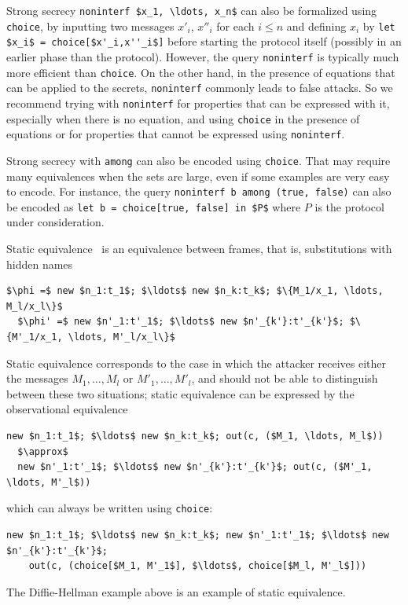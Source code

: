 \documentclass{book}
\begin{document}
Strong secrecy \lstinline!noninterf $x_1, \ldots, x_n$! can also be
formalized using \lstinline!choice!, by inputting two messages $x'_i$,
$x''_i$ for each $i \leq n$ and defining $x_i$ by
\lstinline!let $x_i$ = choice[$x'_i,x''_i$]!
before starting the protocol itself (possibly
in an earlier phase than the protocol). However, the query
\lstinline!noninterf! is typically much more efficient than
\lstinline!choice!. On the other hand, in the presence of equations
that can be applied to the secrets, \lstinline!noninterf! commonly
leads to false attacks. So we recommend trying with
\lstinline!noninterf! for properties that can be expressed with it,
especially when there is no equation, and using \lstinline!choice!  in
the presence of equations or for properties that cannot be expressed
using \lstinline!noninterf!.

Strong secrecy with \lstinline!among! can also be encoded using
\lstinline!choice!. That may require many equivalences when the sets
are large, even if some examples are very easy to encode. For
instance, the query \lstinline!noninterf b among (true, false)! can also
be encoded
as \lstinline!let b = choice[true, false] in $P$! where $P$ is the
protocol under consideration.

Static equivalence~\cite{Abadi2001} is an equivalence between frames, that is, substitutions with hidden names
\begin{lstlisting}[numbers=none]
  $\phi =$ new $n_1:t_1$; $\ldots$ new $n_k:t_k$; $\{M_1/x_1, \ldots, M_l/x_l\}$
  $\phi' =$ new $n'_1:t'_1$; $\ldots$ new $n'_{k'}:t'_{k'}$; $\{M'_1/x_1, \ldots, M'_l/x_l\}$
\end{lstlisting}
Static equivalence corresponds to the case in which the attacker receives
either the messages $M_1, \ldots, M_l$ or $M'_1, \ldots, M'_l$, and
should not be able to distinguish between these two situations;
static equivalence can be expressed by the observational equivalence
\begin{lstlisting}[numbers=none]
  new $n_1:t_1$; $\ldots$ new $n_k:t_k$; out(c, ($M_1, \ldots, M_l$))
  $\approx$
  new $n'_1:t'_1$; $\ldots$ new $n'_{k'}:t'_{k'}$; out(c, ($M'_1, \ldots, M'_l$))
\end{lstlisting}
which can always be written using \lstinline!choice!:
\begin{lstlisting}[numbers=none]
  new $n_1:t_1$; $\ldots$ new $n_k:t_k$; new $n'_1:t'_1$; $\ldots$ new $n'_{k'}:t'_{k'}$;
    out(c, (choice[$M_1, M'_1$], $\ldots$, choice[$M_l, M'_l$]))
\end{lstlisting}
The Diffie-Hellman example above is an example of static equivalence.
\end{document}
